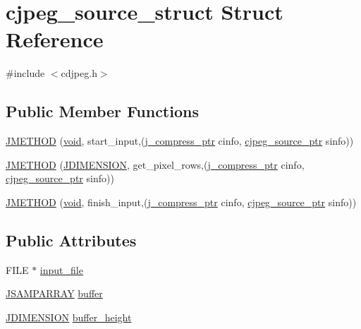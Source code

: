 \hypertarget{structcjpeg__source__struct}{}\section{cjpeg\+\_\+source\+\_\+struct Struct Reference}
\label{structcjpeg__source__struct}


{\ttfamily \#include $<$cdjpeg.\+h$>$}

\subsection*{Public Member Functions}
\begin{DoxyCompactItemize}
\item 
\hyperlink{structcjpeg__source__struct_a0c0027418e48e9cd566807b4c7110aa1}{J\+M\+E\+T\+H\+O\+D} (\hyperlink{png_8h_aa8c59027f9ab2769342f248709d68d17}{void}, start\+\_\+input,(\hyperlink{jpeglib_8h_add2a072c54e3a51550f4975f7ddb91e7}{j\+\_\+compress\+\_\+ptr} cinfo, \hyperlink{cdjpeg_8h_ae615c12420b980baea9b2f93fabd0978}{cjpeg\+\_\+source\+\_\+ptr} sinfo))
\item 
\hyperlink{structcjpeg__source__struct_adac53dc0fdf95208d2458921ebacb93e}{J\+M\+E\+T\+H\+O\+D} (\hyperlink{jmorecfg_8h_a04ed4674f6f1d0d50ec241531e38274f}{J\+D\+I\+M\+E\+N\+S\+I\+O\+N}, get\+\_\+pixel\+\_\+rows,(\hyperlink{jpeglib_8h_add2a072c54e3a51550f4975f7ddb91e7}{j\+\_\+compress\+\_\+ptr} cinfo, \hyperlink{cdjpeg_8h_ae615c12420b980baea9b2f93fabd0978}{cjpeg\+\_\+source\+\_\+ptr} sinfo))
\item 
\hyperlink{structcjpeg__source__struct_a58d0834ab3f3ed64eba2251415744b71}{J\+M\+E\+T\+H\+O\+D} (\hyperlink{png_8h_aa8c59027f9ab2769342f248709d68d17}{void}, finish\+\_\+input,(\hyperlink{jpeglib_8h_add2a072c54e3a51550f4975f7ddb91e7}{j\+\_\+compress\+\_\+ptr} cinfo, \hyperlink{cdjpeg_8h_ae615c12420b980baea9b2f93fabd0978}{cjpeg\+\_\+source\+\_\+ptr} sinfo))
\end{DoxyCompactItemize}
\subsection*{Public Attributes}
\begin{DoxyCompactItemize}
\item 
F\+I\+L\+E $\ast$ \hyperlink{structcjpeg__source__struct_a88d55b02438c0a3ce21422aa8578679e}{input\+\_\+file}
\item 
\hyperlink{jpeglib_8h_ac9d5d1b829ed51769db69a37271a7e91}{J\+S\+A\+M\+P\+A\+R\+R\+A\+Y} \hyperlink{structcjpeg__source__struct_a2ffe2e6e6af7f434f712295d1760e001}{buffer}
\item 
\hyperlink{jmorecfg_8h_a04ed4674f6f1d0d50ec241531e38274f}{J\+D\+I\+M\+E\+N\+S\+I\+O\+N} \hyperlink{structcjpeg__source__struct_a01c25aca7ac8fed165b05139aeb1f762}{buffer\+\_\+height}
\end{DoxyCompactItemize}


